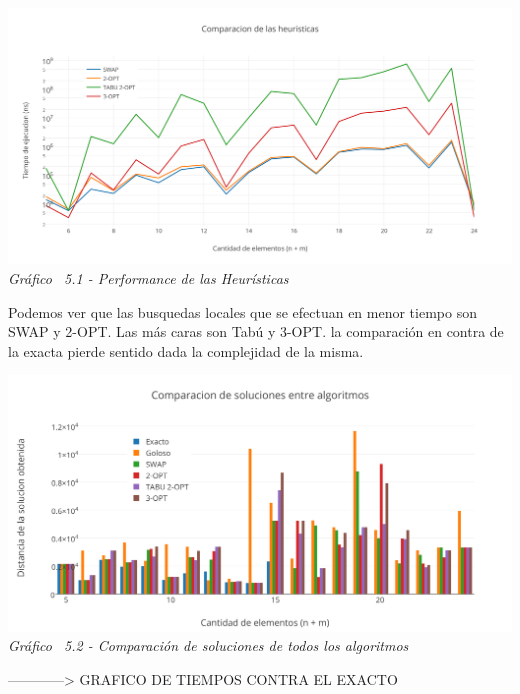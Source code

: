 \vspace*{0.3cm} \vspace*{0.3cm}
  \begin{center}
 \includegraphics[scale=0.5]{./EJ5/medicion.png}\\
 {\textit{Gráfico \ 5.1 - Performance de las Heur\'isticas}}
  \end{center}
  \vspace*{0.3cm}


Podemos ver que las busquedas locales que se efectuan en menor tiempo son SWAP y 2-OPT. Las más caras son Tabú y 3-OPT. la comparación en contra de la exacta pierde sentido dada la complejidad de la misma.


\vspace*{0.3cm} \vspace*{0.3cm}
  \begin{center}
 \includegraphics[scale=0.5]{./EJ5/comparativo.png}\\
 {\textit{Gráfico \ 5.2 - Comparaci\'on de soluciones de todos los algoritmos}}
  \end{center}
  \vspace*{0.3cm}
  
  
  
  ------------> GRAFICO DE TIEMPOS CONTRA EL EXACTO

